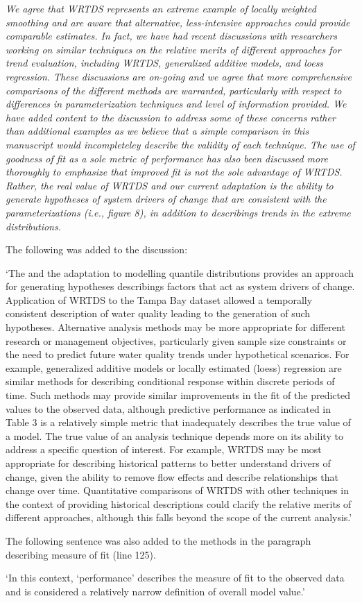 \documentclass[letterpaper,12pt,oneside]{article}\usepackage[]{graphicx}\usepackage[]{color}
\begin{document}
{\it We agree that WRTDS represents an extreme example of locally weighted smoothing and are aware that alternative, less-intensive approaches could provide comparable estimates.  In fact, we have had recent discussions with researchers working on similar techniques on the relative merits of different approaches for trend evaluation, including WRTDS, generalized additive models, and loess regression.  These discussions are on-going and we agree that more comprehensive comparisons of the different methods are warranted, particularly with respect to differences in parameterization techniques and level of information provided.  We have added content to the discussion to address some of these concerns rather than additional examples as we believe that a simple comparison in this manuscript would incompleteley describe the validity of each technique.  The use of goodness of fit as a sole metric of performance has also been discussed more thoroughly to emphasize that improved fit is not the sole advantage of WRTDS.  Rather, the real value of WRTDS and our current adaptation is the ability to generate hypotheses of system drivers of change that are consistent with the parameterizations (i.e., figure 8), in addition to describings trends in the extreme distributions.  

The following was added to the discussion:

`The  and the adaptation to modelling quantile distributions provides an approach for generating hypotheses describings factors that act as system drivers of change.  Application of \ac{WRTDS} to the Tampa Bay dataset allowed a temporally consistent description of water quality leading to the generation of such hypotheses.  Alternative analysis methods may be more appropriate for different research or management objectives, particularly given sample size constraints or the need to predict future water quality trends under hypothetical scenarios.  For example, generalized additive models or locally estimated (loess) regression are similar methods for describing conditional response within discrete periods of time.  Such methods may provide similar improvements in the fit of the predicted values to the observed data, although predictive performance as indicated in Table 3 is a relatively simple metric that inadequately describes the true value of a model. The true value of an analysis technique depends more on its ability to address a specific question of interest.  For example, \ac{WRTDS} may be most appropriate for describing historical patterns to better understand drivers of change, given the ability to remove flow effects and describe relationships that change over time.  Quantitative comparisons of \ac{WRTDS} with other techniques in the context of providing historical descriptions could clarify the relative merits of different approaches, although this falls beyond the scope of the current analysis.'

The following sentence was also added to the methods in the paragraph describing measure of fit (line 125).  

`In this context, `performance' describes the measure of fit to the observed data and is considered a relatively narrow definition of overall model value.'
}
\end{document}
